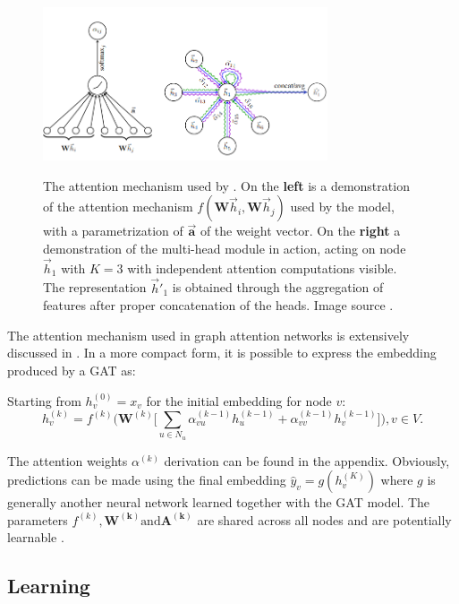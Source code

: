 \begin{figure}[H]
  \centering
  \includegraphics[width=0.75\textwidth]{Figures/chap_gnn/multiheadgat.png}
  \label{fig:multiheadGAN}
  \caption[Multi-head attention mechanism for representation
extraction]{The attention mechanism used by
\citet{velickovic2017graph}. On the \textbf{left} is a demonstration
of the attention mechanism $f(\bm{W}\vec{h}_i, \bm{W}\vec{h}_j) $ used
by the model, with a parametrization of $\bm{\vec{a}}$ of the weight
vector. On the \textbf{right} a demonstration of the multi-head module
in action, acting on node $\vec{h}_1$ with $K=3$ with independent
attention computations visible. The representation $\vec{h}'_1$ is
obtained through the aggregation of features after proper
concatenation of the heads. Image source \cite{velickovic2017graph}.}
\end{figure}

The attention mechanism used in graph attention networks is extensively
discussed in . In a more compact form, it is possible
to express the embedding produced by a GAT as:

Starting from $h_v^{(0)} = x_v$ for the initial embedding for node $v$:
\begin{equation}
h_v^{(k)} = f^{(k)} \Big( \bm{W}^{(k)}\Big[ \sum_{u\in
N_u}\alpha^{(k-1)}_{vu}h^{(k-1)}_u +
\alpha_{vv}^{(k-1)}h_v^{(k-1)}\Big] \Big), v \in V.
\label{eq:gat_compact}
\end{equation}

The attention weights $\alpha^{(k)}$ derivation can be found in the
appendix. Obviously, predictions can be made using the final embedding
$\hat{y}_v = g(h_v^{(K)})$ where $g$ is generally another neural network
learned together with the GAT model. The parameters $f^{(k)}, \bm{W^{(k)}} \text{and}
\bm{A^{(k)}}$ are shared across all nodes and are potentially learnable \cite{daigavane2021understanding}.

\subsection{Learning}

